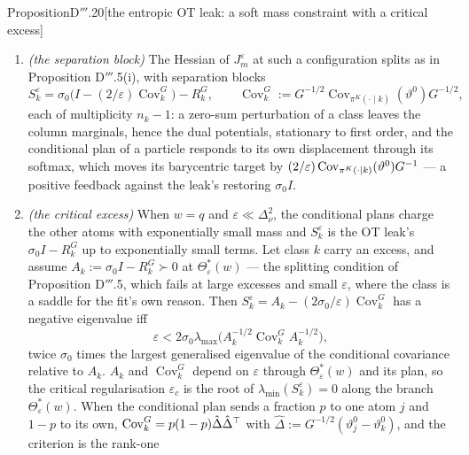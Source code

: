 \begin{thm}{Proposition}{D$'''$.20}[the entropic OT leak: a soft mass constraint with a critical excess]
\begin{enumerate}[label=\textup{(\roman*)}]
    plan from $\sum_kw_k\delta_{\vartheta_k}$ to $\nu$, so every particle of class $k$ has the class target
    $T_k = \sum_j(\pi^K_{kj}/w_k)\vartheta^0_j$, and the replicated configuration is a critical point of
    $J^\varepsilon_m$ iff its atoms are a critical point of the weighted $K$-atom energy with the leak
    $(\sigma_0/2)\mathrm{OT}_\varepsilon(\sum_kw_k\delta_{\vartheta_k},\nu)$.
  \item \emph{(the separation block)} The Hessian of $J^\varepsilon_m$ at such a configuration splits as in
    Proposition D$'''$.5(i), with separation blocks
    \[
      S^\varepsilon_k = \sigma_0\bigl(I - (2/\varepsilon)\operatorname{Cov}^G_k\bigr) - R^G_k,\qquad
      \operatorname{Cov}^G_k := G^{-1/2}\operatorname{Cov}_{\pi^K(\cdot\mid k)}(\vartheta^0)G^{-1/2},
    \]
    each of multiplicity $n_k - 1$: a zero-sum perturbation of a class leaves the column marginals, hence the dual
    potentials, stationary to first order, and the conditional plan of a particle responds to its own displacement
    through its softmax, which moves its barycentric target by
    $(2/\varepsilon)\operatorname{Cov}_{\pi^K(\cdot\mid k)}(\vartheta^0)G^{-1}$ --- a positive feedback against the
    leak's restoring $\sigma_0I$.
  \item \emph{(the critical excess)} When $w = q$ and $\varepsilon\ll\Delta_\nu^2$, the conditional plans charge the
    other atoms with exponentially small mass and $S^\varepsilon_k$ is the OT leak's $\sigma_0I - R^G_k$ up to
    exponentially small terms. Let class $k$ carry an excess, and assume $A_k := \sigma_0I - R^G_k\succ0$ at
    $\Theta^*_\varepsilon(w)$ --- the splitting condition of Proposition D$'''$.5, which fails at large excesses and
    small $\varepsilon$, where the class is a saddle for the fit's own reason. Then
    $S^\varepsilon_k = A_k - (2\sigma_0/\varepsilon)\operatorname{Cov}^G_k$ has a negative eigenvalue iff
    \[
      \varepsilon < 2\sigma_0\lambda_{\max}\bigl(A_k^{-1/2}\operatorname{Cov}^G_kA_k^{-1/2}\bigr),
    \]
    twice $\sigma_0$ times the largest generalised eigenvalue of the conditional covariance relative to $A_k$. $A_k$
    and $\operatorname{Cov}^G_k$ depend on $\varepsilon$ through $\Theta^*_\varepsilon(w)$ and its plan, so the
    critical regularisation $\varepsilon_c$ is the root of $\lambda_{\min}(S^\varepsilon_k) = 0$ along the branch
    $\Theta^*_\varepsilon(w)$. When the conditional plan sends a fraction $p$ to one atom $j$ and $1 - p$ to its own,
    $\operatorname{Cov}^G_k = p(1 - p)\hat\Delta\hat\Delta^\top$ with
    $\hat\Delta := G^{-1/2}(\vartheta^0_j - \vartheta^0_k)$, and the criterion is the rank-one

\end{enumerate}
\end{thm}
